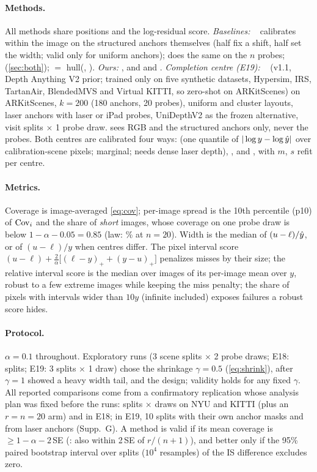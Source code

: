 \paragraph{Methods.}
All methods share positions and the log-residual score.
\emph{Baselines:} \mLocal~\cite{mao2024spatial} calibrates within the image on the structured anchors themselves (half fix a shift, half set the width; valid only for uniform anchors); \mLocalSplit does the same on the $n$ probes; \mDistSplit (\cref{sec:both}); \mDistBoth $=$ hull(\mDistSplit, \mLocalSplit).
\emph{Ours:} \mDual\ifenvelopemain, \mDualBoth and \mDualEnv\else{} and \mDualBoth\fi.
\emph{Completion centre (E19):} \omnidc~\cite{zuo2025omnidc} (v1.1, Depth Anything V2 prior; trained only on five synthetic datasets, Hypersim, IRS, TartanAir, BlendedMVS and Virtual KITTI, so zero-shot on ARKitScenes) on ARKitScenes, $k=200$ (180 anchors, 20 probes), uniform and cluster layouts, laser anchors with laser or iPad probes, UniDepthV2 as the frozen alternative, \NumOmniSeeds{} visit splits $\times$ 1 probe draw.
\omnidc sees RGB and the structured anchors only, never the probes.
Both centres are calibrated four ways: \mSplitCP (one quantile of $|\log y-\log\hat{y}|$ over calibration-scene pixels; marginal; needs dense laser depth), \mDistSplit, \mDual and \mDualBoth, with $m$, $s$ refit per centre.

\paragraph{Metrics.}
Coverage is image-averaged \cref{eq:cov}; per-image spread is the 10th percentile (p10) of $\mathrm{Cov}_i$ and the share of \emph{short} images, whose coverage on one probe draw is below $1-\alpha-0.05=0.85$ (law: \NumBetaShortOneTwenty\% at $n=20$).
Width is the median of $(u-\ell)/\hat{y}$, or of $(u-\ell)/y$ when centres differ.
The pixel interval score $(u-\ell)+\tfrac{2}{\alpha}\big[(\ell-y)_+ + (y-u)_+\big]$ penalizes misses by their size; the relative interval score is the median over images of its per-image mean over $y$, robust to a few extreme images while keeping the miss penalty; the share of pixels with intervals wider than $10y$ (infinite included) exposes failures a robust score hides.

\paragraph{Protocol.}
$\alpha=0.1$ throughout.
Exploratory runs (3 scene splits $\times$ 2 probe draws; E18: \NumReplSplits{} splits; E19: 3 splits $\times$ 1 draw) chose the shrinkage $\gamma=0.5$ (\cref{eq:shrink}), after $\gamma=1$ showed a heavy width tail, and the design; validity holds for any fixed $\gamma$.
All reported comparisons come from a confirmatory replication whose analysis plan was fixed before the runs: \NumReplSplits{} splits $\times$ \NumProbeDraws{} draws on NYU and KITTI (plus an $r=n=20$ arm) and in E18; in E19, 10 splits with their own anchor masks and \omnidc from laser anchors (Supp.~G).
A method is valid if its mean coverage is $\ge1-\alpha-2\,$SE (\mDual: also within 2\,SE of $r/(n+1)$), and better only if the 95\% paired bootstrap interval over splits ($10^4$ resamples) of the IS difference excludes zero.
